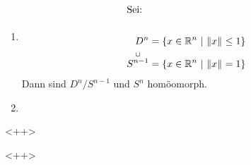 \documentclass{skript}
\begin{document}
\begin{bsps}[Quotienten]
    \begin{enumerate}
        \item
            \begin{align}
                \intertext{Sei:} \\
                D^n &= \mdef[x\in\R^n]{\norm{x}\leq 1} \\
                \overset{\cup}{S^{n-1}} &= \mdef[x\in\R^n]{\norm{x} = 1}
            \end{align}
            Dann sind $D^n/S^{n-1}$ und $S^n$ homöomorph.
        \item 
    \end{enumerate}<++>
\end{bsps}<++>
\end{document}
